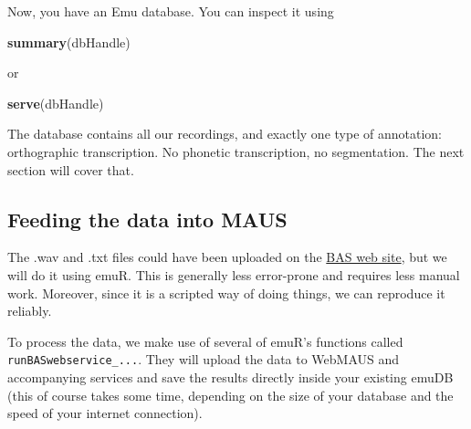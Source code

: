 \documentclass[]{book}
\newenvironment{Shaded}{\begin{snugshade}}{\end{snugshade}}
\newcommand{\KeywordTok}[1]{\textcolor[rgb]{0.13,0.29,0.53}{\textbf{{#1}}}}
\newcommand{\NormalTok}[1]{{#1}}
\theoremstyle{definition}
\theoremstyle{definition}
\theoremstyle{definition}
\theoremstyle{remark}
\begin{document}
Now, you have an Emu database. You can inspect it using

\begin{Shaded}
\begin{Highlighting}[]
\KeywordTok{summary}\NormalTok{(dbHandle)}
\end{Highlighting}
\end{Shaded}

or

\begin{Shaded}
\begin{Highlighting}[]
\KeywordTok{serve}\NormalTok{(dbHandle)}
\end{Highlighting}
\end{Shaded}

The database contains all our recordings, and exactly one type of
annotation: orthographic transcription. No phonetic transcription, no
segmentation. The next section will cover that.

\subsection{Feeding the data into
MAUS}\label{feeding-the-data-into-maus}

The .wav and .txt files could have been uploaded on the
\href{https://clarin.phonetik.uni-muenchen.de/BASWebServices/\#!/services/Pipeline}{BAS
web site}, but we will do it using emuR. This is generally less
error-prone and requires less manual work. Moreover, since it is a
scripted way of doing things, we can reproduce it reliably.

To process the data, we make use of several of emuR's functions called
\texttt{runBASwebservice\_...}. They will upload the data to WebMAUS and
accompanying services and save the results directly inside your existing
emuDB (this of course takes some time, depending on the size of your
database and the speed of your internet connection).
\end{document}
